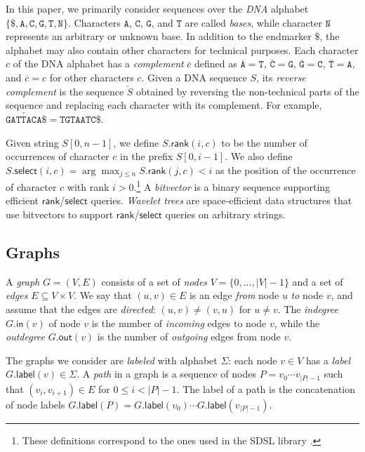 \documentclass[a4paper,UKenglish]{lipics-v2016}
\newcommand{\set}[1]{\ensuremath{\{ #1 \}}}
\newcommand{\abs}[1]{\ensuremath{\lvert #1 \rvert}}
\newcommand{\dnaseq}[1]{\ensuremath{\mathtt{#1}}}
\newcommand{\baseA}{\dnaseq{A}}
\newcommand{\baseC}{\dnaseq{C}}
\newcommand{\baseG}{\dnaseq{G}}
\newcommand{\baseT}{\dnaseq{T}}
\newcommand{\baseN}{\dnaseq{N}}
\newcommand{\dnacomp}[1]{\ensuremath{\overline{#1}}}
\newcommand{\revcomp}[1]{\ensuremath{\overleftarrow{#1}}}
\newcommand{\rank}{\ensuremath{\mathsf{rank}}}
\newcommand{\select}{\ensuremath{\mathsf{select}}}
\newcommand{\gindegree}{\ensuremath{\mathsf{in}}}
\newcommand{\goutdegree}{\ensuremath{\mathsf{out}}}
\newcommand{\glabel}{\ensuremath{\mathsf{label}}}
\begin{document}
In this paper, we primarily consider sequences over the \emph{DNA} alphabet $\set{\$, \baseA, \baseC, \baseG, \baseT, \baseN}$. Characters $\baseA$, $\baseC$, $\baseG$, and $\baseT$ are called \emph{bases}, while character $\baseN$ represents an arbitrary or unknown base. In addition to the endmarker $\$$, the alphabet may also contain other characters for technical purposes. Each character $c$ of the DNA alphabet has a \emph{complement} $\dnacomp{c}$ defined as $\dnacomp{\baseA} = \baseT$, $\dnacomp{\baseC} = \baseG$, $\dnacomp{\baseG} = \baseC$, $\dnacomp{\baseT} = \baseA$, and $\dnacomp{c} = c$ for other characters $c$. Given a DNA sequence $S$, its \emph{reverse complement} is the sequence $\revcomp{S}$ obtained by reversing the non-technical parts of the sequence and replacing each character with its complement. For example, $\revcomp{\dnaseq{GATTACA}\$} = \dnaseq{TGTAATC}\$$.

Given string $S[0, n-1]$, we define $S.\rank(i, c)$ to be the number of occurrences of character $c$ in the prefix $S[0, i-1]$. We also define $S.\select(i, c) = \arg \max_{j \le n} S.\rank(j, c) < i$ as the position of the occurrence of character $c$ with rank $i > 0$.\footnote{These definitions correspond to the ones used in the SDSL library \cite{Gog2014b}.} A \emph{bitvector} is a binary sequence supporting efficient $\rank$/$\select$ queries. \emph{Wavelet trees} \cite{Grossi2003} are space-efficient data structures that use bitvectors to support $\rank$/$\select$ queries on arbitrary strings.

\subsection{Graphs}

A \emph{graph} $G = (V, E)$ consists of a set of \emph{nodes} $V = \set{0, \dotsc, \abs{V}-1}$ and a set of \emph{edges} $E \subseteq V \times V$. We say that $(u, v) \in E$ is an edge \emph{from} node $u$ \emph{to} node $v$, and assume that the edges are \emph{directed}: $(u, v) \ne (v, u)$ for $u \ne v$. The \emph{indegree} $G.\gindegree(v)$ of node $v$ is the number of \emph{incoming} edges to node $v$, while the \emph{outdegree} $G.\goutdegree(v)$ is the number of \emph{outgoing} edges from node $v$.

The graphs we consider are \emph{labeled} with alphabet $\Sigma$: each node $v \in V$ has a \emph{label} $G.\glabel(v) \in \Sigma$. A \emph{path} in a graph is a sequence of nodes $P = v_{0} \dotsm v_{\abs{P}-1}$ such that $(v_{i}, v_{i+1}) \in E$ for $0 \le i < \abs{P}-1$. The label of a path is the concatenation of node labels $G.\glabel(P) = G.\glabel(v_{0}) \dotsm G.\glabel(v_{\abs{P}-1})$.
\end{document}
